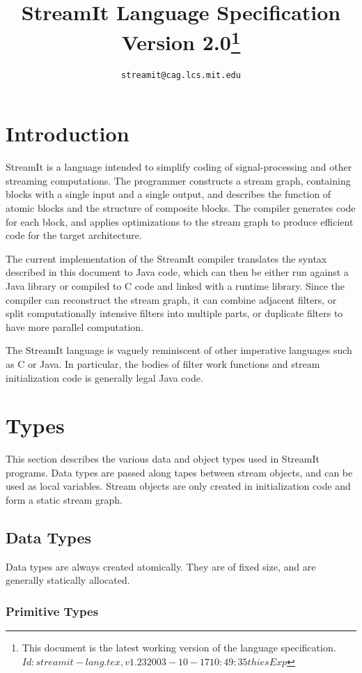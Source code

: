 \documentclass[11pt]{article}
\title{StreamIt Language Specification\\
Version 2.0\ifprerel\thanks{
This document is the latest working version of the language specification.\hfil\break\ttfamily
\hbox{$Id: streamit-lang.tex,v 1.23 2003-10-17 10:49:35 thies Exp $}
}\fi}
\author{\texttt{streamit@cag.lcs.mit.edu}}
\begin{document}
\maketitle
\tableofcontents

\section{Introduction}

StreamIt is a language intended to simplify coding of
signal-processing and other streaming computations.  The programmer
constructs a stream graph, containing blocks with a single input and a
single output, and describes the function of atomic blocks and the
structure of composite blocks.  The compiler generates code for each
block, and applies optimizations to the stream graph to produce
efficient code for the target architecture.

The current implementation of the StreamIt compiler translates the
syntax described in this document to Java code, which can then be
either run against a Java library or compiled to C code and linked
with a runtime library.  Since the compiler can reconstruct the stream
graph, it can combine adjacent filters, or split computationally
intensive filters into multiple parts, or duplicate filters to have
more parallel computation.

The StreamIt language is vaguely reminiscent of other imperative
languages such as C or Java.  In particular, the bodies of filter work
functions and stream initialization code is generally legal Java
code.

\section{Types}

This section describes the various data and object types used in
StreamIt programs.  Data types are passed along tapes between stream
objects, and can be used as local variables.  Stream objects are only
created in initialization code and form a static stream graph.

\subsection{Data Types}

Data types are always created atomically.  They are of fixed size, and
are generally statically allocated.

\subsubsection{Primitive Types}
\label{sec:primitive-types}
\end{document}
